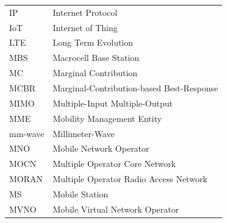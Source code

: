 \begin{tabular}{ll}

%
%
IP & Internet Protocol\\
IoT & Internet of Thing\\

LTE & Long Term Evolution\\

MBS  & Macrocell Base Station\\
MC & Marginal Contribution\\
MCBR & Marginal-Contribution-based Best-Response\\
MIMO & Multiple-Input Multiple-Output\\
MME & Mobility Management Entity\\
mm-wave & Millimeter-Wave \\
MNO & Mobile Network Operator\\
MOCN & Multiple Operator Core Network\\
MORAN & Multiple Operator Radio Access Network\\
MS & Mobile Station\\
MVNO & Mobile Virtual Network Operator\\


\end{tabular}
